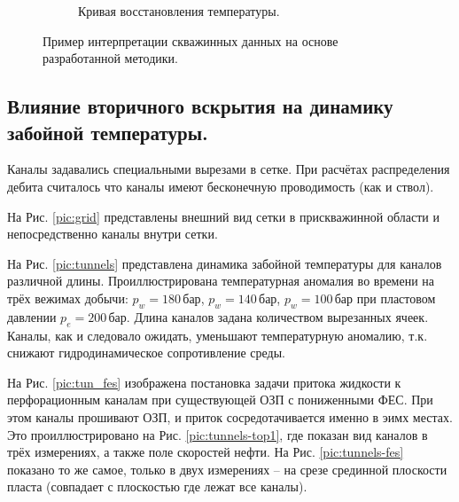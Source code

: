 \begin{figure}[H]
\begin{subfigure}[b]{0.5\textwidth}
		\caption{Кривая восстановления температуры.}
		\label{pic:adapt_temp1}
	\end{subfigure}
	\caption{Пример интерпретации скважинных данных на основе разработанной методики.}
	\label{pic:adapt}
\end{figure}

\subsection{Влияние вторичного вскрытия на динамику забойной температуры.}
	Каналы задавались специальными вырезами в сетке. При расчётах распределения дебита считалось что каналы имеют бесконечную проводимость (как и ствол).
	
	На Рис. \ref{pic:grid} представлены внешний вид сетки в прискважинной области и непосредственно каналы внутри сетки.
	
	На Рис. \ref{pic:tunnels} представлена динамика забойной температуры для каналов различной длины.
	Проиллюстрирована температурная аномалия во времени на трёх вежимах добычи: $p_w=180\,\text{бар}$, $p_w=140\,\text{бар}$, $p_w=100\,\text{бар}$ при пластовом давлении $p_e=200\,\text{бар}$. Длина каналов задана
	количеством вырезанных ячеек.
	Каналы, как и следовало ожидать, уменьшают температурную аномалию, т.к. снижают гидродинамическое сопротивление среды.

	На Рис. \ref{pic:tun_fes} изображена постановка задачи притока жидкости к перфорационным каналам при существующей ОЗП с пониженными ФЕС.
	При этом каналы прошивают ОЗП, и приток сосредотачивается именно в эимх местах.
	Это проиллюстрировано на Рис. \ref{pic:tunnels-top1}, где показан вид каналов в трёх измерениях, а также поле скоростей нефти. На Рис. \ref{pic:tunnels-fes} показано то же самое, только в двух измерениях -- на срезе срединной плоскости пласта (совпадает с плоскостью где лежат все каналы).
	
